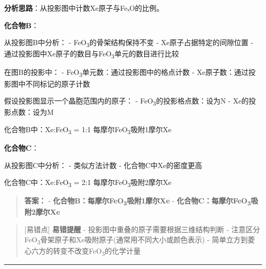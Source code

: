 \textbf{分析思路}：从投影图中计数Xe原子与FeₓO的比例。

\textbf{化合物B}：

从投影图B中分析：
- FeO\textsubscript{3}的骨架结构保持不变
- Xe原子占据特定的间隙位置
- 通过投影图中Xe原子的数目与FeO\textsubscript{3}单元的数目进行比较

在图B的投影中：
- FeO\textsubscript{3}单元数：通过投影图中的格点计数
- Xe原子数：通过投影图中不同标记的原子计数

假设投影图显示一个晶胞范围内的原子：
- FeO\textsubscript{3}的投影格点数：设为N
- Xe的投影点数：设为M

化合物B中：Xe:FeO\textsubscript{3} = 1:1 \箭 每摩尔FeO\textsubscript{3}吸附1摩尔Xe

\textbf{化合物C}：

从投影图C中分析：
- 类似方法计数
- 化合物C中Xe的密度更高

化合物C中：Xe:FeO\textsubscript{3} = 2:1 \箭 每摩尔FeO\textsubscript{3}吸附2摩尔Xe

\begin{quote}
\textbf{答案：}
- \textbf{化合物B：每摩尔FeO\textsubscript{3}吸附1摩尔Xe}
- \textbf{化合物C：每摩尔FeO\textsubscript{3}吸附2摩尔Xe}
\end{quote}

\begin{quote}
{[}易错点{]} \textbf{易错提醒}
- 投影图中重叠的原子需要根据三维结构判断
- 注意区分FeO\textsubscript{3}骨架原子和Xe吸附原子(通常用不同大小或颜色表示)
- 简单立方到菱心六方的转变不改变FeO\textsubscript{3}的化学计量
\end{quote}

\begin{center}\rule{0.5\linewidth}{0.5pt}\end{center}
